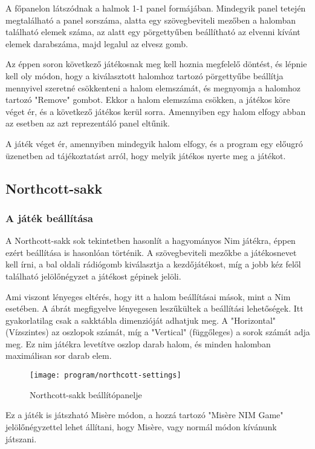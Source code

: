 A főpanelon látszódnak a halmok 1-1 panel formájában. Mindegyik panel tetején megtalálható a panel sorszáma, alatta egy szövegbeviteli mezőben a halomban található elemek száma, az alatt egy pörgettyűben beállítható az elvenni kívánt elemek darabszáma, majd legalul az elvesz gomb. \ujsor

Az éppen soron következő játékosnak meg kell hoznia megfelelő döntést, és lépnie kell oly módon, hogy a kiválasztott halomhoz tartozó pörgettyűbe beállítja mennyivel szeretné csökkenteni a halom elemszámát, és megnyomja a halomhoz tartozó "Remove" gombot. Ekkor a halom elemszáma csökken, a játékos köre véget ér, és a következő játékos kerül sorra. Amennyiben egy halom elfogy abban az esetben az azt reprezentáló panel eltűnik.\ujsor

A játék véget ér, amennyiben mindegyik halom elfogy, és a program egy előugró üzenetben ad tájékoztatást arról, hogy melyik játékos nyerte meg a játékot.

\subsection{Northcott-sakk}
\subsubsection*{A játék beállítása}
A Northcott-sakk sok tekintetben hasonlít a hagyományos Nim játékra, éppen ezért beállítása is hasonlóan történik. A szövegbeviteli mezőkbe a játékosnevet kell írni, a bal oldali rádiógomb kiválasztja a kezdőjátékost, míg a jobb kéz felől található jelölőnégyzet a játékost gépinek jelöli.\ujsor

Ami viszont lényeges eltérés, hogy itt a halom beállításai mások, mint a Nim esetében. A  ábrát megfigyelve lényegesen leszűkültek a beállítási lehetőségek. Itt gyakorlatilag csak a sakktábla dimenzióját adhatjuk meg. A "Horizontal" (Vízszintes) az oszlopok számát, míg a "Vertical" (függőleges) a sorok számát adja meg. Ez nim játékra levetítve oszlop darab halom, és minden halomban maximálisan sor darab elem.

\begin{figure}[ht]
	\texttt{[image: program/northcott-settings]}
	\centering
	\caption{Northcott-sakk beállítópanelje}
	\label{fig:northcott-settings}
\end{figure}

Ez a játék is játszható Misère módon, a hozzá tartozó "Misère NIM Game" jelölőnégyzettel lehet állítani, hogy Misère, vagy normál módon kívánunk játszani.


